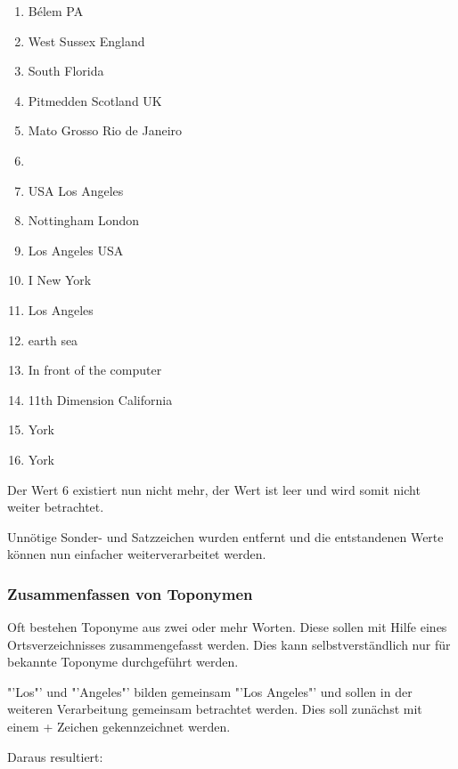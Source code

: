 				\begin{multicols}{2}
					\begin{enumerate}
						\item Bélem PA
						\item West Sussex England
						\item South Florida
						\item Pitmedden Scotland UK
						\item Mato Grosso Rio de Janeiro
						\item 
						\item USA Los Angeles
						\item Nottingham London
						\item Los Angeles USA
						\item I New York 
						\item Los Angeles
						\item earth sea
						\item In front of the computer
						\item 11th Dimension California
						\item York
						\item York
					\end{enumerate}
				\end{multicols}

				Der Wert 6 existiert nun nicht mehr, der Wert ist leer und wird somit nicht weiter betrachtet.

				Unnötige Sonder- und Satzzeichen wurden entfernt und die entstandenen Werte können nun einfacher weiterverarbeitet werden.

			\subsubsection{Zusammenfassen von Toponymen}

				Oft bestehen Toponyme aus zwei oder mehr Worten.
				Diese sollen mit Hilfe eines Ortsverzeichnisses zusammengefasst werden. 
				Dies kann selbstverständlich nur für bekannte Toponyme durchgeführt werden.
				
				"'Los"' und "'Angeles"' bilden gemeinsam "'Los Angeles"' und sollen in der weiteren Verarbeitung gemeinsam betrachtet werden. 
				Dies soll zunächst mit einem + Zeichen gekennzeichnet werden.

				Daraus resultiert:

